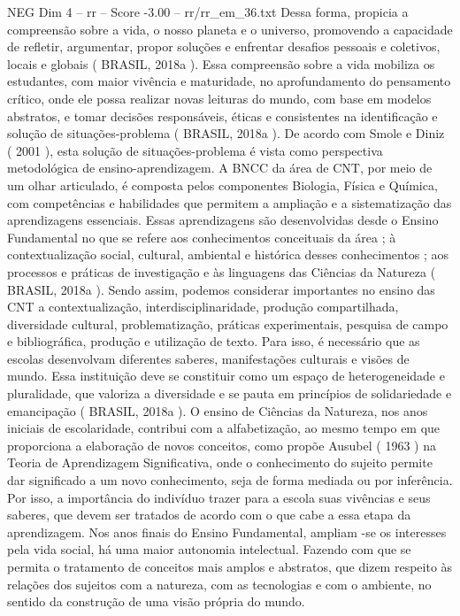 \begin{textsample}{NEG Dim 4 – rr – Score -3.00 – rr/rr\_em\_36.txt}
Dessa forma, propicia a compreensão sobre a vida, o nosso planeta e o universo, promovendo a capacidade de refletir, argumentar, propor soluções e enfrentar desafios pessoais e coletivos, locais e globais ( BRASIL, 2018a ).
Essa compreensão sobre a vida mobiliza os estudantes, com maior vivência e maturidade, no aprofundamento do pensamento crítico, onde ele possa realizar novas leituras do mundo, com base em modelos abstratos, e tomar decisões responsáveis, éticas e consistentes na identificação e solução de situações-problema ( BRASIL, 2018a ).
De acordo com Smole e Diniz ( 2001 ), esta solução de situações-problema é vista como perspectiva metodológica de ensino-aprendizagem.
A BNCC da área de CNT, por meio de um olhar articulado, é composta pelos componentes Biologia, Física e Química, com competências e habilidades que permitem a ampliação e a sistematização das aprendizagens essenciais.
Essas aprendizagens são desenvolvidas desde o Ensino Fundamental no que se refere aos conhecimentos conceituais da área ; à contextualização social, cultural, ambiental e histórica desses conhecimentos ; aos processos e práticas de investigação e às linguagens das Ciências da Natureza ( BRASIL, 2018a ).
Sendo assim, podemos considerar importantes no ensino das CNT a contextualização, interdisciplinaridade, produção compartilhada, diversidade cultural, problematização, práticas experimentais, pesquisa de campo e bibliográfica, produção e utilização de texto.
Para isso, é necessário que as escolas desenvolvam diferentes saberes, manifestações culturais e visões de mundo.
Essa instituição deve se constituir como um espaço de heterogeneidade e pluralidade, que valoriza a diversidade e se pauta em princípios de solidariedade e emancipação ( BRASIL, 2018a ).
O ensino de Ciências da Natureza, nos anos iniciais de escolaridade, contribui com a alfabetização, ao mesmo tempo em que proporciona a elaboração de novos conceitos, como propõe Ausubel ( 1963 ) na Teoria de Aprendizagem Significativa, onde o conhecimento do sujeito permite dar significado a um novo conhecimento, seja de forma mediada ou por inferência.
Por isso, a importância do indivíduo trazer para a escola suas vivências e seus saberes, que devem ser tratados de acordo com o que cabe a essa etapa da aprendizagem.
Nos anos finais do Ensino Fundamental, ampliam -se os interesses pela vida social, há uma maior autonomia intelectual.
Fazendo com que se permita o tratamento de conceitos mais amplos e abstratos, que dizem respeito às relações dos sujeitos com a natureza, com as tecnologias e com o ambiente, no sentido da construção de uma visão própria do mundo.

\end{textsample}
